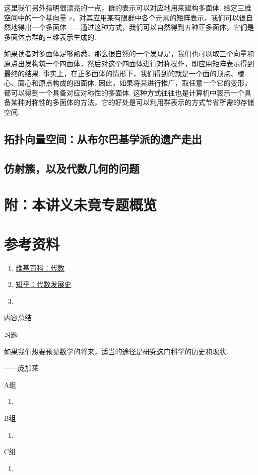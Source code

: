 这里我们另外指明很漂亮的一点，群的表示可以对应地用来建构多面体. 给定三维空间中的一个基向量 $v$，对其应用某有限群中各个元素的矩阵表示，我们可以很自然地得出一个多面体——通过这种方式，我们可以自然得到五种正多面体，它们是多面体点群的三维表示生成的.

如果读者对多面体足够熟悉，那么很自然的一个发现是，我们也可以取三个向量和原点出发构筑一个四面体，然后对这个四面体进行对称操作，即应用矩阵表示得到最终的结果. 事实上，在正多面体的情形下，我们得到的就是一个面的顶点、棱心、面心和原点构成的四面体. 因此，如果将其进行推广，取任意一个它的变形，都可以得到一个具备对应对称性的多面体. 这种方式往往也是计算机中表示一个具备某种对称性的多面体的方法，它的好处是可以利用群表示的方式节省所需的存储空间.

\subsection{拓扑向量空间：从布尔巴基学派的遗产走出}

\subsection{仿射簇，以及代数几何的问题}

\section*{附：本讲义未竟专题概览}


\section*{参考资料}
\begin{enumerate}
    \item \href{https://zh.wikipedia.org/wiki/%E4%BB%A3%E6%95%B0}{维基百科：代数}
    \item \href{https://zhuanlan.zhihu.com/p/574858845}{知乎：代数发展史}
    \item
\end{enumerate}
\vspace{2ex}
\centerline{\heiti \Large 内容总结}

\vspace{2ex}

\centerline{\heiti \Large 习题}
\vspace{2ex}
{\kaishu 如果我们想要预见数学的将来，适当的途径是研究这门科学的历史和现状.}
\begin{flushright}
    \kaishu
    ——庞加莱
\end{flushright}
\centerline{\heiti A组}
\begin{enumerate}
    \item
\end{enumerate}
\centerline{\heiti B组}
\begin{enumerate}
    \item
\end{enumerate}
\centerline{\heiti C组}
\begin{enumerate}
    \item
\end{enumerate}
